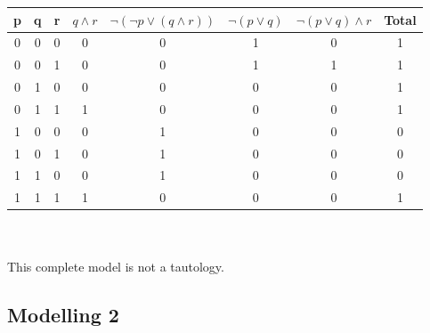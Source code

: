 \begin{large}
\begin{enumerate}[label=(\alph*)]
          \begin{tabular}{c|c|c|c|c|c|c||c}
            p & q & r & $ q \land r $ & $ \neg(\neg p \lor ( q \land r)) $ & $ \neg (p \lor q) $ & $ \neg (p \lor q) \land r $ & Total \\
            \hline\hline
            0 & 0 & 0 & 0             & 0                                  & 1                   & 0                           & 1     \\
            \hline
            0 & 0 & 1 & 0             & 0                                  & 1                   & 1                           & 1     \\
            \hline
            0 & 1 & 0 & 0             & 0                                  & 0                   & 0                           & 1     \\
            \hline
            0 & 1 & 1 & 1             & 0                                  & 0                   & 0                           & 1     \\
            \hline
            1 & 0 & 0 & 0             & 1                                  & 0                   & 0                           & 0     \\
            \hline
            1 & 0 & 1 & 0             & 1                                  & 0                   & 0                           & 0     \\
            \hline
            1 & 1 & 0 & 0             & 1                                  & 0                   & 0                           & 0     \\
            \hline
            1 & 1 & 1 & 1             & 0                                  & 0                   & 0                           & 1     \\
            \hline
          \end{tabular}
          \\ \\
          This complete model is not a tautology.
  \end{enumerate}
\end{large}

\subsection{Modelling 2}
\begin{large}

\end{large}